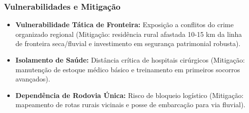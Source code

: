 \subsubsection{Vulnerabilidades e
Mitigação}

\begin{itemize}
\tightlist
\item
  \textbf{Vulnerabilidade Tática de Fronteira:} Exposição a conflitos do
  crime organizado regional (Mitigação: residência rural afastada 10-15
  km da linha de fronteira seca/\allowbreak fluvial e investimento em segurança
  patrimonial robusta).
\item
  \textbf{Isolamento de Saúde:} Distância crítica de hospitais
  cirúrgicos (Mitigação: manutenção de estoque médico básico e
  treinamento em primeiros socorros avançados).
\item
  \textbf{Dependência de Rodovia Única:} Risco de bloqueio logístico
  (Mitigação: mapeamento de rotas rurais vicinais e posse de embarcação
  para via fluvial).
\end{itemize}

